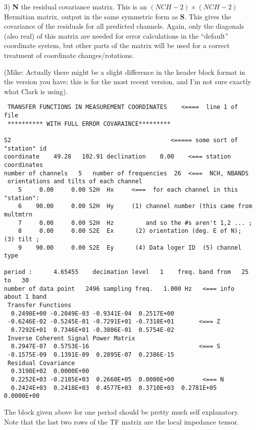 3) {\bf N} the residual covariance matrix.  
This is an $(NCH-2) \times (NCH-2)$ Hermitian matrix,
output in the same symmetric form as {\bf S}.  This
gives the covariance of the residuals
for all predicted channels.  Again,
only the diagonals (also real) of this matrix are needed for 
error calculations in the ``default'' coordinate system, but 
other parts of the matrix will be used for a correct treatment of 
coordinate changes/rotations.


(Mike: Actually there might be a slight difference
in the header block format in the version you have; this is
for the most recent version, and I'm not sure exactly what Clark is
using).

\small
\begin{verbatim}
 TRANSFER FUNCTIONS IN MEASUREMENT COORDINATES    <====  line 1 of file
 ********** WITH FULL ERROR COVARAINCE*********
                                                                                
S2                                             <===== some sort of "station" id
coordinate    49.28   102.91 declination    0.00    <=== station coordinates
number of channels   5   number of frequencies  26  <===  NCH, NBANDS
 orientations and tilts of each channel 
    5     0.00     0.00 S2H  Hx     <===  for each channel in this "station":
    6    90.00     0.00 S2H  Hy     (1) channel number (this came from multmtrn
    7     0.00     0.00 S2H  Hz         and so the #s aren't 1,2 ... ;
    8     0.00     0.00 S2E  Ex      (2) orientation (deg. E of N);  (3) tilt ;
    9    90.00     0.00 S2E  Ey      (4) Data loger ID  (5) channel type
 
period :      4.65455    decimation level   1    freq. band from   25 to   30
number of data point   2496 sampling freq.   1.000 Hz   <=== info about 1 band
 Transfer Functions
  0.2498E+00 -0.2049E-03 -0.9341E-04  0.2517E+00
 -0.6246E-02 -0.5245E-01 -0.7291E+01 -0.7318E+01       <=== Z
  0.7292E+01  0.7346E+01 -0.3806E-01  0.5754E-02
 Inverse Coherent Signal Power Matrix
  0.2947E-07  0.5753E-16                               <=== S
 -0.1575E-09  0.1391E-09  0.2895E-07  0.2386E-15
 Residual Covariance
  0.3198E+02  0.0000E+00
  0.2252E+03 -0.2185E+03  0.2660E+05  0.0000E+00        <=== N
  0.2424E+03  0.2418E+03  0.4577E+03  0.3710E+03  0.2781E+05  0.0000E+00
\end{verbatim}
\normalsize

The block given above for one period should be pretty much self explanatory.
Note that the last two rows of the TF matrix are the
local impedance tensor.

